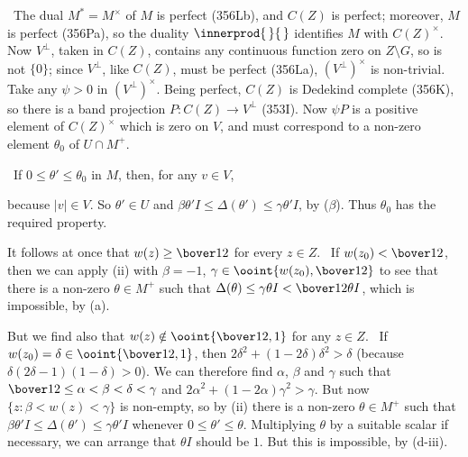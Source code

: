 {\medskip

\qquad\grheadc\ The dual $M^*=M^{\times}$ of $M$ is
perfect (356Lb), and $C(Z)$ is perfect;  moreover, $M$ is perfect
(356Pa), so the duality
$\innerprod{\,}{\,}$ identifies $M$ with $C(Z)^{\times}$.   Now
$V^{\perp}$, taken in $C(Z)$, contains any continuous function zero on
$Z\setminus G$, so is not $\{0\}$;  since $V^{\perp}$, like $C(Z)$, must
be perfect (356La), $(V^{\perp})^{\times}$ is non-trivial.   Take any
$\psi>0$ in $(V^{\perp})^{\times}$.   Being perfect, $C(Z)$ is Dedekind
complete (356K), so there is a band projection $P:C(Z)\to V^{\perp}$
(353I).   Now $\psi P$ is a positive element of $C(Z)^{\times}$
which is zero on $V$, and must correspond to a non-zero element
$\theta_0$ of $U\cap M^+$.

\medskip

\qquad\grheadd\ If $0\le\theta'\le\theta_0$ in $M$,
then, for any $v\in V$,


\noindent because $|v|\in V$.   So $\theta'\in U$ and
$\beta\theta'I\le\Delta(\theta')\le\gamma\theta'I$, by ($\beta$).   Thus
$\theta_0$ has the required property.\ \Qed

\medskip

 It follows at once that $w(z)\ge\bover12$ for every
$z\in Z$.   \Prf\Quer\ If $w(z_0)<\bover12$, then we can apply (ii) with
$\beta=-1$, $\gamma\in\ooint{w(z_0),\bover12}$ to see that there is a
non-zero $\theta\in M^+$ such that $\Delta(\theta)\le\gamma\theta
I<\bover12\theta I$, which is impossible, by (a).\ \Bang\Qed

\medskip

 But we find also that $w(z)\notin\ooint{\bover12,1}$ for
any $z\in Z$.  \Prf\Quer\ If $w(z_0)=\delta\in\ooint{\bover12,1}$, then
$2\delta^2+(1-2\delta)\delta^2>\delta$ (because
$\delta(2\delta-1)(1-\delta)>0$).   We can therefore find $\alpha$,
$\beta$ and $\gamma$ such that $\bover12\le\alpha<\beta<\delta<\gamma$
and $2\alpha^2+(1-2\alpha)\gamma^2>\gamma$.   But now
$\{z:\beta<w(z)<\gamma\}$ is non-empty, so by (ii) there is a non-zero
$\theta\in M^+$ such that
$\beta\theta'I\le\Delta(\theta')\le\gamma\theta'I$ whenever
$0\le\theta'\le\theta$.   Multiplying $\theta$ by a suitable scalar if
necessary, we can arrange that $\theta I$ should be $1$.   But this is
impossible, by (d-iii).\ \Bang\Qed

\medskip

}
